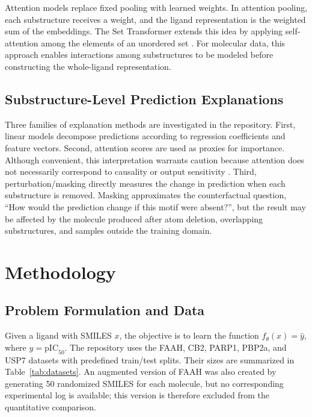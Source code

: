 Attention models replace fixed pooling with learned weights. In attention
pooling, each substructure receives a weight, and the ligand representation is
the weighted sum of the embeddings. The Set Transformer extends this idea by
applying self-attention among the elements of an unordered set
\cite{lee2019set}. For molecular data, this approach enables interactions among
substructures to be modeled before constructing the whole-ligand representation.

\subsection{Substructure-Level Prediction Explanations}

Three families of explanation methods are investigated in the repository.
First, linear models decompose predictions according to regression coefficients
and feature vectors. Second, attention scores are used as proxies for
importance. Although convenient, this interpretation warrants caution because
attention does not necessarily correspond to causality or output sensitivity
\cite{jain2019attention}. Third, perturbation/masking directly measures the
change in prediction when each substructure is removed. Masking approximates the
counterfactual question, ``How would the prediction change if this motif were
absent?'', but the result may be affected by the molecule produced after atom
deletion, overlapping substructures, and samples outside the training domain.


\section{Methodology}
\label{sec:methodology}

\subsection{Problem Formulation and Data}

Given a ligand with SMILES \(x\), the objective is to learn the function
\(f_{\theta}(x)=\widehat{y}\), where \(y=\mathrm{pIC}_{50}\). The repository
uses the FAAH, CB2, PARP1, PBP2a, and USP7 datasets with predefined train/test
splits. Their sizes are summarized in Table~\ref{tab:datasets}. An augmented
version of FAAH was also created by generating 50 randomized SMILES for each
molecule, but no corresponding experimental log is available; this version is
therefore excluded from the quantitative comparison.


